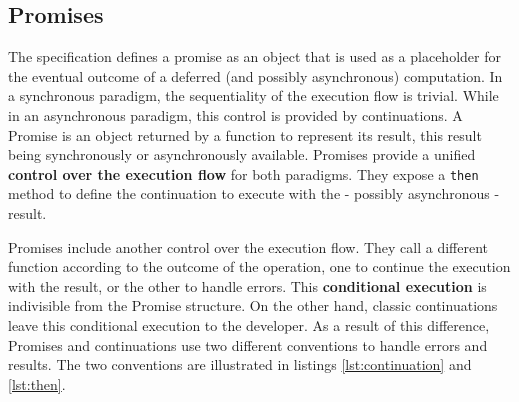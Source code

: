 \subsection{Promises} \label{section:definitions:promise}



The specification defines a promise as an object that is used as a placeholder for the eventual outcome of a deferred (and possibly asynchronous) computation.
In a synchronous paradigm, the sequentiality of the execution flow is trivial.
While in an asynchronous paradigm, this control is provided by continuations.
A Promise is an object returned by a function to represent its result, this result being synchronously or asynchronously available.
Promises provide a unified \textbf{control over the execution flow} for both paradigms.
They expose a \texttt{then} method to define the continuation to execute with the - possibly asynchronous - result.


Promises include another control over the execution flow.
They call a different function according to the outcome of the operation, one to continue the execution with the result, or the other to handle errors.
This \textbf{conditional execution} is indivisible from the Promise structure.
On the other hand, classic continuations leave this conditional execution to the developer.
As a result of this difference, Promises and continuations use two different conventions to handle errors and results.
The two conventions are illustrated in listings \ref{lst:continuation} and \ref{lst:then}.

